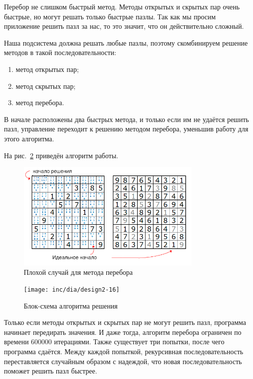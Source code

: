 Перебор не слишком быстрый метод. Методы открытых  и скрытых пар очень быстрые, но могут решать только быстрые пазлы. Так как мы просим приложение решить пазл за нас, то это значит, что он действительно сложный. 

Наша подсистема должна решать любые пазлы, поэтому скомбинируем решение методов в такой последовательности:

\begin{enumerate}
  \item метод открытых пар;
  \item метод скрытых пар;
  \item метод перебора.
\end{enumerate}

В начале расположены два быстрых метода, и только если им не удаётся решить пазл, управление переходит к решению методом перебора, уменьшив работу для этого алгоритма. 

На рис.~\ref{fig:fig23} приведён алгоритм работы. 

\begin{figure}[ht!]
 \centering 
 \includegraphics[width=0.8\textwidth]{inc/raster/design2-19.png} 
 \caption{Плохой случай для метода перебора} 
 \label{fig:fig19} 
\end{figure}

\begin{figure}[ht!]
  \centering
  \texttt{[image: inc/dia/design2-16]}
  \caption{Блок-схема алгоритма решения}
  \label{fig:fig23}
\end{figure}

Только если методы открытых и скрытых пар не могут решить пазл, программа начинает передирать значения. И даже тогда, алгоритм перебора ограничен по времени 600000 итерациями. Также существует три попытки, после чего программа сдаётся. Между каждой попыткой, рекурсивная последовательность переставляется случайным образом с надеждой, что новая последовательность поможет решить пазл быстрее. 


